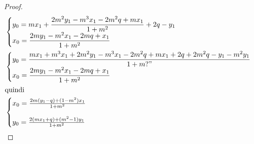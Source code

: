 \begin{proof}
\begin{align*}
	 & \begin{cases}
	 y_0=mx_1+\dfrac{2m^2y_1-m^3x_1-2m^2q+mx_1}{1+m^2}+2q-y_1\\
	 x_0=\dfrac{2my_1-m^2x_1-2mq+x_1}{1+m^2}
	 \end{cases}\\
	 & \begin{cases}
	 	y_0=\dfrac{mx_1+m^3x_1+2m^2y_1-m^3x_1-2m^2q+mx_1+2q+2m^2q-y_1-m^2y_1}{1+m?"}\\
	 	x_0=\dfrac{2my_1-m^2x_1-2mq+x_1}{1+m^2}
	 \end{cases}\\
	 \intertext{quindi}
	 &\begin{cases}
	 x_0=\frac{2m(y_1-q)+(1-m^2)x_1}{1+m^2}\\[0.4cm]
	 y_0=\frac{2(mx_1+q)+(m^2-1)y_1}{1+m^2}
	 \end{cases}
 \end{align*}
 \end{proof}
